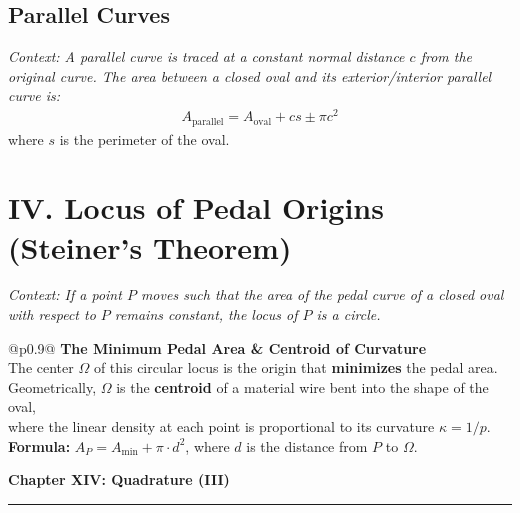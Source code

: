 \documentclass[11pt, a4paper]{article}
\begin{document}
\subsection*{\color{secondary} Parallel Curves}
\textit{\small Context: A parallel curve is traced at a constant normal distance $c$ from the original curve. The area between a closed oval and its exterior/interior parallel curve is:}
\begin{align*}
    A_{\text{parallel}} = A_{\text{oval}} + cs \pm \pi c^2
\end{align*}
where $s$ is the perimeter of the oval.

\section*{\color{primary} IV. Locus of Pedal Origins (Steiner's Theorem)}

\textit{\small Context: If a point $P$ moves such that the area of the pedal curve of a closed oval with respect to $P$ remains constant, the locus of $P$ is a circle.}

\begin{center}
\begin{tabular}{@{}p{0.9\columnwidth}@{}}
\toprule
\textbf{The Minimum Pedal Area \& Centroid of Curvature} \\
\midrule
The center $\Omega$ of this circular locus is the origin that \textbf{minimizes} the pedal area. \\
Geometrically, $\Omega$ is the \textbf{centroid} of a material wire bent into the shape of the oval, \\
where the linear density at each point is proportional to its curvature $\kappa = 1/p$. \\
\textbf{\color{accent}Formula:} $A_P = A_{\min} + \pi \cdot d^2$, where $d$ is the distance from $P$ to $\Omega$. \\
\bottomrule
\end{tabular}
\end{center}

\vspace{0.3cm}

\newpage

\begin{center}
    {\LARGE \bfseries \color{accent} Chapter XIV: Quadrature (III)}\\
    \vspace{0.2cm}
    {\color{accent}\rule{0.55\linewidth}{0.8pt}}
\end{center}
\vspace{0.35cm}
\end{document}
